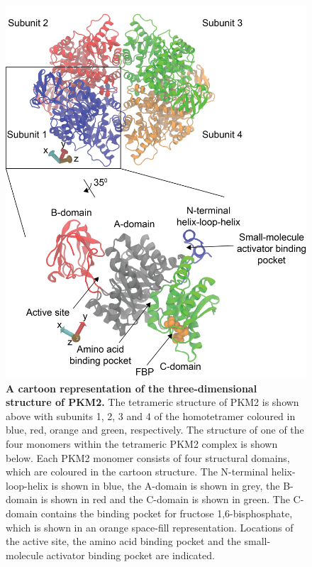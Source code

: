 \begin{figure}[!ht]
\includegraphics[scale=0.6]{pkm2_structure.png}
\caption[A cartoon representation of the three-dimensional structure of PKM2.]{\textbf{A cartoon representation of the three-dimensional structure of PKM2.} The tetrameric structure of PKM2 is shown above with subunits 1, 2, 3 and 4 of the homotetramer coloured in blue, red, orange and green, respectively. The structure of one of the four monomers within the tetrameric PKM2 complex is shown below. Each PKM2 monomer consists of four structural domains, which are coloured in the cartoon structure. The N-terminal helix-loop-helix is shown in blue, the A-domain is shown in grey, the B-domain is shown in red and the C-domain is shown in green. The C-domain contains the binding pocket for fructose 1,6-bisphosphate, which is shown in an orange space-fill representation. Locations of the active site, the amino acid binding pocket and the small-molecule activator binding pocket are indicated.}
\label{fig:pkm2_structure_schematic}
\end{figure}
%
%
%
%
